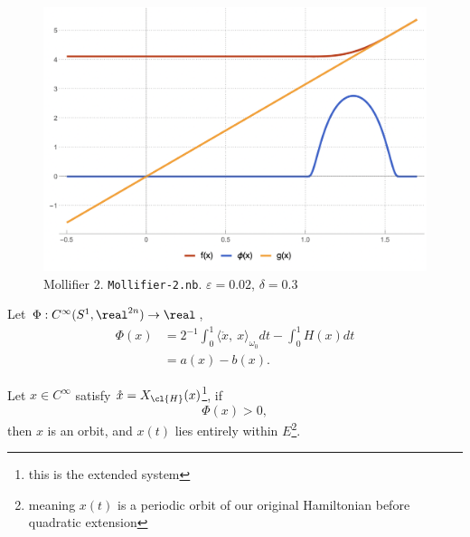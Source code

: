 \documentclass[../main-v2-manifolds.tex]{subfiles}
\begin{document}
\begin{figure}
    \centering
    \includegraphics[width=0.8\linewidth]{images/mollifier-2-zoomedout.png}
    \caption{Mollifier 2. \texttt{Mollifier-2.nb}. $\varepsilon = 0.02$, $\delta=0.3$}
    \label{fig:mollifier-2-zoomed-out}
\end{figure}
\clearpage
{}
\begin{definition}
    Let $\Phi:C^\infty(S^1,\realtn)\to\real$,
    \begin{align*}
        \Phi(x) &= 2^{-1}\int_0^1\langle \mathring{x},\ x\rangle_{\omega_0} dt- \int_0^1 H(x)dt\\[1ex]
        &=a(x) - b(x).
    \end{align*}
\end{definition}
\begin{wts}[Localization inside $E = \{q<1\}$]\label{thm:localization-theorem}
    Let $x\in C^\infty$ satisfy $\mathring{x} = X_{\cl{H}}(x)$\footnote{this is the extended system}, if 
    \[
        \Phi(x)>0,
    \] 
    then $x$ is an orbit, and $x(t)$ lies entirely within $E$\footnote{meaning $x(t)$ is a periodic orbit of our original Hamiltonian before quadratic extension}.
\end{wts}
\end{document}
